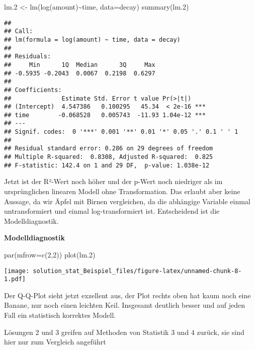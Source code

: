 \documentclass[
]{article}
\newenvironment{Shaded}{\begin{snugshade}}{\end{snugshade}}
\newcommand{\AttributeTok}[1]{\textcolor[rgb]{0.77,0.63,0.00}{#1}}
\newcommand{\DecValTok}[1]{\textcolor[rgb]{0.00,0.00,0.81}{#1}}
\newcommand{\FloatTok}[1]{\textcolor[rgb]{0.00,0.00,0.81}{#1}}
\newcommand{\FunctionTok}[1]{\textcolor[rgb]{0.00,0.00,0.00}{#1}}
\newcommand{\NormalTok}[1]{#1}
\newcommand{\OtherTok}[1]{\textcolor[rgb]{0.56,0.35,0.01}{#1}}
\newcommand{\SpecialCharTok}[1]{\textcolor[rgb]{0.00,0.00,0.00}{#1}}
\begin{document}
\begin{Shaded}
\begin{Highlighting}[]
\NormalTok{lm}\FloatTok{.2} \OtherTok{\textless{}{-}} \FunctionTok{lm}\NormalTok{(}\FunctionTok{log}\NormalTok{(amount)}\SpecialCharTok{\textasciitilde{}}\NormalTok{time, }\AttributeTok{data=}\NormalTok{decay)}
\FunctionTok{summary}\NormalTok{(lm}\FloatTok{.2}\NormalTok{)}
\end{Highlighting}
\end{Shaded}

\begin{verbatim}
## 
## Call:
## lm(formula = log(amount) ~ time, data = decay)
## 
## Residuals:
##     Min      1Q  Median      3Q     Max 
## -0.5935 -0.2043  0.0067  0.2198  0.6297 
## 
## Coefficients:
##              Estimate Std. Error t value Pr(>|t|)    
## (Intercept)  4.547386   0.100295   45.34  < 2e-16 ***
## time        -0.068528   0.005743  -11.93 1.04e-12 ***
## ---
## Signif. codes:  0 '***' 0.001 '**' 0.01 '*' 0.05 '.' 0.1 ' ' 1
## 
## Residual standard error: 0.286 on 29 degrees of freedom
## Multiple R-squared:  0.8308, Adjusted R-squared:  0.825 
## F-statistic: 142.4 on 1 and 29 DF,  p-value: 1.038e-12
\end{verbatim}

Jetzt ist der R²-Wert noch höher und der p-Wert noch niedriger als im
ursprünglichen linearen Modell ohne Transformation. Das erlaubt aber
keine Aussage, da wir Äpfel mit Birnen vergleichen, da die abhängige
Variable einmal untransformiert und einmal log-transformiert ist.
Entscheidend ist die Modelldiagnostik.

\textbf{Modelldiagnostik}

\begin{Shaded}
\begin{Highlighting}[]
\FunctionTok{par}\NormalTok{(}\AttributeTok{mfrow=}\FunctionTok{c}\NormalTok{(}\DecValTok{2}\NormalTok{,}\DecValTok{2}\NormalTok{))}
\FunctionTok{plot}\NormalTok{(lm}\FloatTok{.2}\NormalTok{)}
\end{Highlighting}
\end{Shaded}

\texttt{[image: solution\_stat\_Beispiel\_files/figure-latex/unnamed-chunk-8-1.pdf]}

Der Q-Q-Plot sieht jetzt exzellent aus, der Plot rechts oben hat kaum
noch eine Banane, nur noch einen leichten Keil. Insgesamt deutlich
besser und auf jeden Fall ein statistisch korrektes Modell.

Lösungen 2 und 3 greifen auf Methoden von Statistik 3 und 4 zurück, sie
sind hier nur zum Vergleich angeführt
\end{document}
